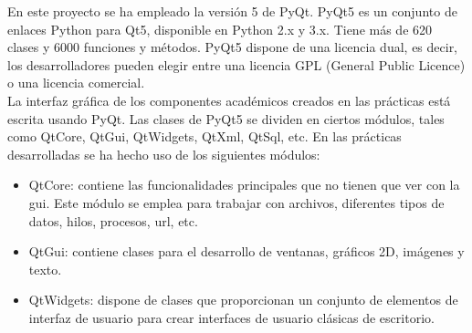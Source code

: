 En este proyecto se ha empleado la versión 5 de PyQt. PyQt5 es un conjunto de enlaces Python para Qt5, disponible en Python 2.x y 3.x. Tiene más de 620 clases y 6000 funciones y métodos. PyQt5 dispone de una licencia dual, es decir, los desarrolladores pueden elegir entre una licencia GPL (General Public Licence) o una licencia comercial. \\

La interfaz gráfica de los componentes académicos creados en las prácticas está escrita usando PyQt. Las clases de PyQt5 se dividen en ciertos módulos, tales como QtCore, QtGui, QtWidgets, QtXml, QtSql, etc. En las prácticas desarrolladas se ha hecho uso de los siguientes módulos:

\begin{itemize}
\item QtCore: contiene las funcionalidades principales que no tienen que ver con la \acrshort{gui}. Este módulo se emplea para trabajar con archivos, diferentes tipos de datos, hilos, procesos, url, etc.
\item QtGui: contiene clases para el desarrollo de ventanas, gráficos 2D, imágenes y texto.
\item QtWidgets: dispone de clases que proporcionan un conjunto de elementos de interfaz de usuario para crear interfaces de usuario clásicas de escritorio. 
\end{itemize}